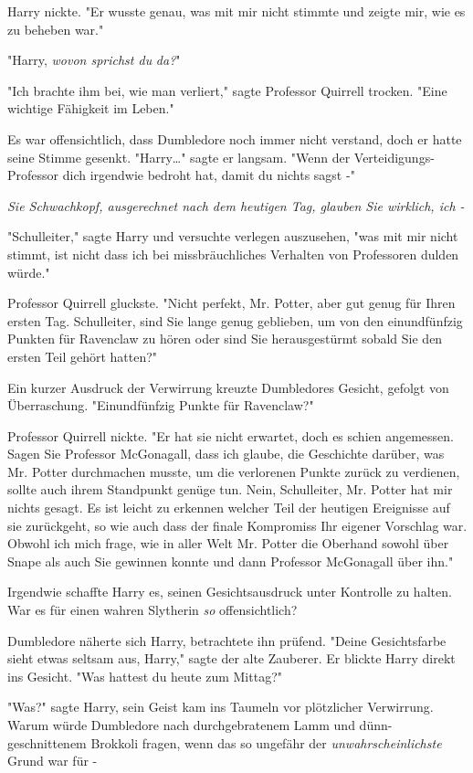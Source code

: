 {Harry nickte. "Er wusste genau, was mit mir nicht stimmte und zeigte mir, wie es zu beheben war."

"Harry, \emph{wovon sprichst du} \emph{da?}"

"Ich brachte ihm bei, wie man verliert," sagte Professor Quirrell trocken. "Eine wichtige Fähigkeit im Leben."

Es war offensichtlich, dass Dumbledore noch immer nicht verstand, doch er hatte seine Stimme gesenkt. "Harry…" sagte er langsam. "Wenn der Verteidigungs-Professor dich irgendwie bedroht hat, damit du nichts sagst -"

\emph{Sie Schwachkopf, ausgerechnet nach dem heutigen Tag, glauben Sie wirklich, ich -}

"Schulleiter," sagte Harry und versuchte verlegen auszusehen, "was mit mir nicht stimmt, ist nicht dass ich bei missbräuchliches Verhalten von Professoren dulden würde."

Professor Quirrell gluckste. "Nicht perfekt, Mr. Potter, aber gut genug für Ihren ersten Tag. Schulleiter, sind Sie lange genug geblieben, um von den einundfünfzig Punkten für Ravenclaw zu hören oder sind Sie herausgestürmt sobald Sie den ersten Teil gehört hatten?"

Ein kurzer Ausdruck der Verwirrung kreuzte Dumbledores Gesicht, gefolgt von Überraschung. "Einundfünfzig Punkte für Ravenclaw?"

Professor Quirrell nickte. "Er hat sie nicht erwartet, doch es schien angemessen. Sagen Sie Professor McGonagall, dass ich glaube, die Geschichte darüber, was Mr. Potter durchmachen musste, um die verlorenen Punkte zurück zu verdienen, sollte auch ihrem Standpunkt genüge tun. Nein, Schulleiter, Mr. Potter hat mir nichts gesagt. Es ist leicht zu erkennen welcher Teil der heutigen Ereignisse auf sie zurückgeht, so wie auch dass der finale Kompromiss Ihr eigener Vorschlag war. Obwohl ich mich frage, wie in aller Welt Mr. Potter die Oberhand sowohl über Snape als auch Sie gewinnen konnte und dann Professor McGonagall über ihn."

Irgendwie schaffte Harry es, seinen Gesichtsausdruck unter Kontrolle zu halten. War es für einen wahren Slytherin \emph{so} offensichtlich?

Dumbledore näherte sich Harry, betrachtete ihn prüfend. "Deine Gesichtsfarbe sieht etwas seltsam aus, Harry," sagte der alte Zauberer. Er blickte Harry direkt ins Gesicht. "Was hattest du heute zum Mittag?"

"Was?" sagte Harry, sein Geist kam ins Taumeln vor plötzlicher Verwirrung. Warum würde Dumbledore nach durchgebratenem Lamm und dünn-geschnittenem Brokkoli fragen, wenn das so ungefähr der \emph{unwahrscheinlichste} Grund war für -

}

